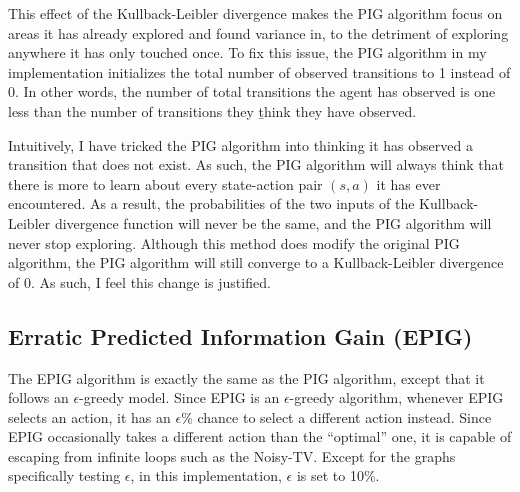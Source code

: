 \documentclass[12pt]{thesis}
\begin{document}
This effect of the Kullback-Leibler divergence makes the PIG algorithm focus on areas it has already explored and found variance in, to the detriment of exploring anywhere it has only touched once. To fix this issue, the PIG algorithm in my implementation initializes the total number of observed transitions to 1 instead of 0. In other words, the number of total transitions the agent has observed is one less than the number of transitions they \b{think} they have observed.

Intuitively, I have tricked the PIG algorithm into thinking it has observed a transition that does not exist. As such, the PIG algorithm will always think that there is more to learn about every state-action pair $(s,a)$ it has ever encountered. As a result, the probabilities of the two inputs of the Kullback-Leibler divergence function will never be the same, and the PIG algorithm will never stop exploring. Although this method does modify the original PIG algorithm, the PIG algorithm will still converge to a Kullback-Leibler divergence of 0. As such, I feel this change is justified.

\subsection{Erratic Predicted Information Gain (EPIG)}
The EPIG algorithm is exactly the same as the PIG algorithm, except that it follows an $\epsilon$-greedy model. Since EPIG is an $\epsilon$-greedy algorithm, whenever EPIG selects an action, it has an $\epsilon$\% chance to select a different action instead. Since EPIG occasionally takes a different action than the ``optimal'' one, it is capable of escaping from infinite loops such as the Noisy-TV. Except for the graphs specifically testing $\epsilon$, in this implementation, $\epsilon$ is set to 10\%.
\end{document}
